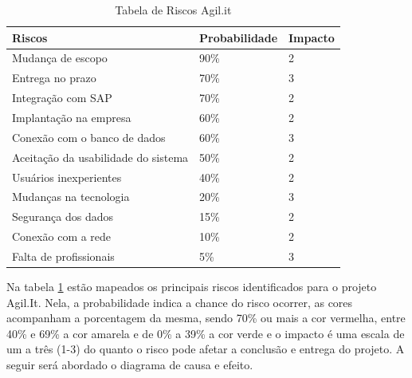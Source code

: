 \begin{table}[h]
	\centering
	\caption{\label{tebela_risco} Tabela de Riscos Agil.it}
	\begin{tabular}{l|l|l}
		\hline
		\rowcolor[HTML]{EFEFEF} 
		\textbf{Riscos}                     & \textbf{Probabilidade} & \textbf{Impacto} \\ \hline
		\rowcolor[HTML]{DD7346} 
		Mudança de escopo                   & 90\%                   & 2                \\ \hline
		\rowcolor[HTML]{DD7346} 
		Entrega no prazo                    & 70\%                   & 3                \\ \hline
		\rowcolor[HTML]{DD7346} 
		Integração com SAP                  & 70\%                   & 2                \\ \hline
		\rowcolor[HTML]{FFFE65} 
		Implantação na empresa              & 60\%                   & 2                \\ \hline
		\rowcolor[HTML]{FFFE65} 
		Conexão com o banco de dados        & 60\%                   & 3                \\ \hline
		\rowcolor[HTML]{FFFE65} 
		Aceitação da usabilidade do sistema & 50\%                   & 2                \\ \hline
		\rowcolor[HTML]{FFFE65} 
		Usuários inexperientes              & 40\%                   & 2                \\ \hline
		\rowcolor[HTML]{9AFF99} 
		Mudanças na tecnologia              & 20\%                   & 3                \\ \hline
		\rowcolor[HTML]{9AFF99} 
		Segurança dos dados                 & 15\%                   & 2                \\ \hline
		\rowcolor[HTML]{9AFF99} 
		Conexão com a rede                  & 10\%                   & 2                \\ \hline
		\rowcolor[HTML]{9AFF99} 
		Falta de profissionais              & 5\%                    & 3                \\ \hline
	\end{tabular}
\end{table}

Na tabela \ref{tebela_risco} estão mapeados os principais riscos identificados para o projeto Agil.It. Nela, a probabilidade indica a chance do risco ocorrer, as cores acompanham a porcentagem da mesma, sendo 70\% ou mais a cor vermelha, entre 40\% e 69\% a cor amarela e de 0\% a 39\% a cor verde e o impacto é uma escala de um a três (1-3) do quanto o risco pode afetar a conclusão e entrega do projeto. A seguir será abordado o diagrama de causa e efeito.

